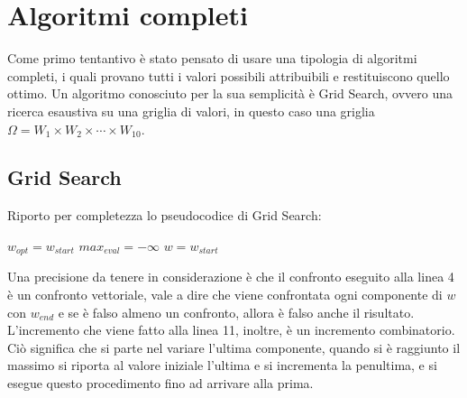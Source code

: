 \section{Algoritmi completi}
Come primo tentantivo è stato pensato di usare una tipologia di algoritmi completi,
i quali provano tutti i valori possibili attribuibili e restituiscono quello ottimo. Un algoritmo
conosciuto per la sua semplicità è Grid Search, ovvero una ricerca esaustiva
su una griglia di valori, in questo caso una griglia $\Omega = W_1 \times W_2 \times \cdots \times W_{10}$.

\subsection{Grid Search}

Riporto per completezza lo pseudocodice di Grid Search:

\begin{algorithm}[h]
	\small
	\DontPrintSemicolon
	\BlankLine
	$w_{opt} = w_{start}$\;
	$max_{eval} = -\infty$\;
	$w = w_{start}$\;
	\BlankLine
	\caption{\textsc{}}
	\label{alg:gss}
\end{algorithm}

Una precisione da tenere in considerazione è che il confronto
eseguito alla linea 4 è un confronto vettoriale, vale a dire che
viene confrontata ogni componente di $w$ con $w_{end}$ e se
è falso almeno un confronto, allora è falso anche il risultato.
L'incremento che viene fatto alla linea 11, inoltre, è un incremento
combinatorio. Ciò significa che si parte nel variare
l'ultima componente, quando si è raggiunto il massimo si
riporta al valore iniziale l'ultima e si incrementa la penultima,
e si esegue questo procedimento fino ad arrivare alla prima.

